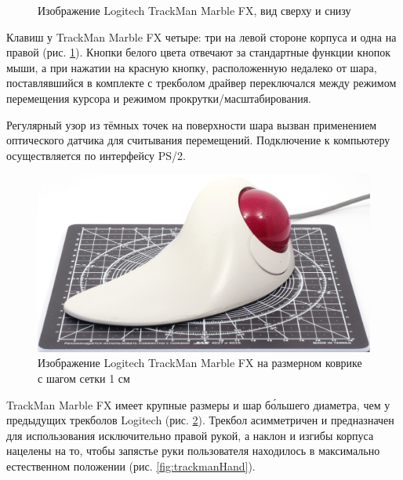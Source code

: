 \documentclass[11pt, a4paper]{article}
\begin{document}
\begin{figure}[h]
    \caption{Изображение Logitech TrackMan Marble FX, вид сверху и снизу}
    \label{fig:trackmanTopAndBottom}
\end{figure}

Клавиш у TrackMan Marble FX четыре: три на левой стороне корпуса и одна на правой (рис. \ref{fig:trackmanTopAndBottom}).
Кнопки белого цвета отвечают за стандартные функции кнопок мыши, а при нажатии на красную кнопку, расположенную недалеко от шара, поставлявшийся в комплекте с трекболом драйвер переключался между режимом перемещения курсора и режимом прокрутки/масштабирования.

Регулярный узор из тёмных точек на поверхности шара вызван применением оптического датчика для считывания перемещений. Подключение к компьютеру осуществляется по интерфейсу PS/2.

\begin{figure}[h]
    \centering
    \includegraphics[scale=0.4]{1998_logitech_trackman_marble_fx/size_30.jpg}
    \caption{Изображение Logitech TrackMan Marble FX на размерном коврике с шагом сетки 1 см}
    \label{fig:trackmanSize}
\end{figure}

TrackMan Marble FX имеет крупные размеры и шар б\'{о}льшего диаметра, чем у предыдущих трекболов Logitech (рис. \ref{fig:trackmanSize}). Трекбол асимметричен и предназначен для использования исключительно правой рукой, а наклон и изгибы корпуса нацелены на то, чтобы запястье руки пользователя находилось в максимально естественном положении (рис. \ref{fig:trackmanHand}).
\end{document}
